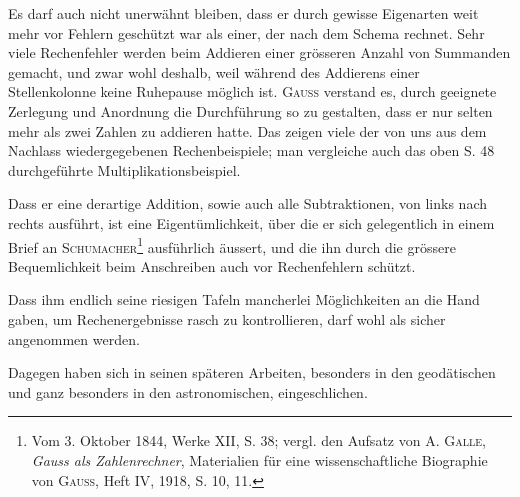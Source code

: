 Es darf auch nicht unerwähnt bleiben, dass er durch gewisse Eigenarten
weit mehr vor Fehlern geschützt war als einer, der nach dem Schema rechnet.
Sehr viele Rechenfehler werden beim Addieren einer grösseren Anzahl von
Summanden gemacht, und zwar wohl deshalb, weil während des Addierens
einer Stellenkolonne keine Ruhepause möglich ist. \textsc{Gauss} verstand es, durch
geeignete Zerlegung und Anordnung die Durchführung so zu gestalten, dass
er nur selten mehr als zwei Zahlen zu addieren hatte. Das zeigen viele der
von uns aus dem Nachlass wiedergegebenen Rechenbeispiele; man vergleiche
auch das oben S. 48 durchgeführte Multiplikationsbeispiel.

Dass er eine derartige Addition, sowie auch alle Subtraktionen, von links
nach rechts ausführt, ist eine Eigentümlichkeit, über die er sich gelegentlich
\clearpage{}
\setcounter{footnote}{0}
\noindent in einem Brief an \textsc{Schumacher}\footnote{Vom 3. Oktober 1844, Werke XII, S. 38; vergl. den Aufsatz von A. \textsc{Galle}, \textit{Gauss als Zahlenrechner}, Materialien für eine wissenschaftliche Biographie von \textsc{Gauss}, Heft IV, 1918, S. 10, 11.} ausführlich äussert, und die ihn durch die
grössere Bequemlichkeit beim Anschreiben auch vor Rechenfehlern schützt.

Dass ihm endlich seine riesigen Tafeln mancherlei Möglichkeiten an die
Hand gaben, um Rechenergebnisse rasch zu kontrollieren, darf wohl als sicher
angenommen werden.

Dagegen haben sich in seinen späteren Arbeiten, besonders in den geodätischen und ganz besonders in den astronomischen,  eingeschlichen.

